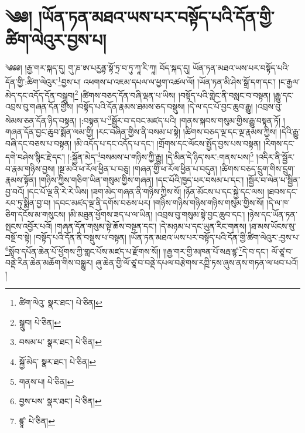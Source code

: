\setcounter{footnote}{0} 
\chapter{༄༅། །ཡོན་ཏན་མཐའ་ཡས་པར་བསྟོད་པའི་དོན་གྱི་ཚིག་ལེའུར་བྱས་པ།}༄༅༅། །རྒྱ་གར་སྐད་དུ། གུ་ཎ་ཨ་པརྱནྟ་སྟོ་ཏྲ་བ་ཏུ་ཀཱ་རི་ཀཱ། བོད་སྐད་དུ། ཡོན་ཏན་མཐའ་ཡས་པར་བསྟོད་པའི་དོན་གྱི་:ཚིག་ལེའུར་\footnote{ཚིག་ལེའུ་  སྣར་ཐང་།  པེ་ཅིན། }བྱས་པ། འཕགས་པ་འཇམ་དཔལ་ལ་ཕྱག་འཚལ་ལོ། །ཡོན་ཏན་མི་ཤེས་སྒྲོ་དག་དང་། །ང་རྒྱལ་མེད་དང་འདོད་དོན་བསྒྲུབ།\footnote{སྒྲུབ།  པེ་ཅིན། } །ཚིགས་བཅད་དོན་བཞི་ལྡན་པ་ཡིས། །བསྟོད་པའི་གླེང་ནི་བསླང་བ་བསྟན། །རྒྱུ་དང་འབྲས་བུ་གཞན་དོན་གྱིས། །བསྟོད་པའི་དོན་རྣམས་ཐམས་ཅད་བསྡུས། །དེ་ལ་དང་པོ་བྱང་ཆུབ་རྒྱུ། །འབྲས་བུ་སེམས་ཅན་དོན་ཉིད་བསྟན། །:བསྟན་པ་\footnote{བསམ་པ་  སྣར་ཐང་།  པེ་ཅིན། }སྦྱོར་བ་དབང་མཛད་པའི། །གནས་སྐབས་གསུམ་གྱིས་རྒྱུ་བསྟན་ཏོ། །གཞན་དོན་བྱང་ཆུབ་སྨོན་ལམ་གྱི། །རང་བཞིན་གྱིས་ནི་བསམ་པ་སྟེ། །ཚིགས་བཅད་ལྔ་དང་ལྔ་རྣམས་ཀྱིས། །དེའི་རྒྱུ་བཞི་དང་བཅས་པ་བསྟན། །མི་འདོད་པ་དང་འདོད་པ་དང་། །གྲོགས་དང་ལོངས་སྤྱོད་བྱས་པས་བསྟན། །རིགས་དང་དགེ་བཤེས་སྙིང་རྗེ་དང་། །:སྐྱོན་མེད་\footnote{སྐྱོ་མེད་  སྣར་ཐང་།  པེ་ཅིན། }བསམས་པ་གཉིས་ཀྱི་རྒྱུ། །དེ་མིན་དེ་ཉིད་སར་:གནས་པས།\footnote{གནས་པ།  པེ་ཅིན། } །འདིར་ནི་སྦྱོར་བ་རྣམ་གཉིས་བྱས། །སྔ་མའི་ཕ་རོལ་ཕྱིན་པ་བཅུ། །གཞན་གྱི་ཕ་རོལ་ཕྱིན་པ་བདུན། །ཚིགས་བཅད་དྲུག་གིས་དྲུག་རྣམས་སྟོན། །གཉིས་ཀྱིས་གཅིག་ཡིན་གསུམ་གྱིས་གཞན། །དང་པོའི་ཁྱད་པར་བསམ་པ་དང་། །སྦྱོར་བ་ལེན་པ་སྦྱིན་བྱ་བའོ། །དང་པོ་ལྔ་ནི་རེ་རེ་ཡིས། །ཟག་མེད་གཞན་ནི་གཉིས་ཀྱིས་སོ། །ཉོན་མོངས་པ་དང་སྐྱེ་དང་ལས། །ཐབས་དང་རབ་ཏུ་སྨིན་བྱ་བ། །དབང་མཛད་ལྔ་ནི་དགོས་བཅས་པར། །གཉིས་གཉིས་གཉིས་གཉིས་གསུམ་གྱིས་སོ། །དེ་ལ་ཁ་ཅིག་དངོས་མ་གསུངས། །མི་མཐུན་ཕྱོགས་ཟད་པ་ལ་ཡིན། །འབྲས་བུ་གསུམ་སྟེ་བྱང་ཆུབ་དང་། །ཉེས་དང་ཡོན་ཏན་སྤངས་འབྱོར་པའོ། །གཞན་དོན་གསུམ་སྟེ་ཆོས་བསྟན་དང་། །དེ་མཉམ་པ་དང་ཡུན་རིང་གནས། །ཐ་མས་ཡོངས་སུ་བསྔོ་བ་སྟེ། །བསྟོད་པའི་དོན་ནི་བསྡུས་པ་བསྟན། །ཡོན་ཏན་མཐའ་ཡས་པར་བསྟོད་པའི་དོན་གྱི་ཚིག་ལེའུར་:བྱས་པ་\footnote{བྱས་པས་  སྣར་ཐང་།  པེ་ཅིན། }སློབ་དཔོན་ཆེན་པོ་ཕྱོགས་ཀྱི་གླང་པོས་མཛད་པ་རྫོགས་སོ།། །།རྒྱ་གར་གྱི་མཁན་པོ་སརྦ་ཛྙ་\footnote{ཛྙཱ་  པེ་ཅིན། }དེ་བ་དང་། ལོ་ཙཱ་བ་བནྡེ་རིན་ཆེན་མཆོག་གིས་བསྒྱུར། ཞུ་ཆེན་གྱི་ལོ་ཙཱ་བ་བནྡེ་དཔལ་བརྩེགས་རཀྵི་ཏས་ཞུས་ནས་གཏན་ལ་ཕབ་པའོ། ། 